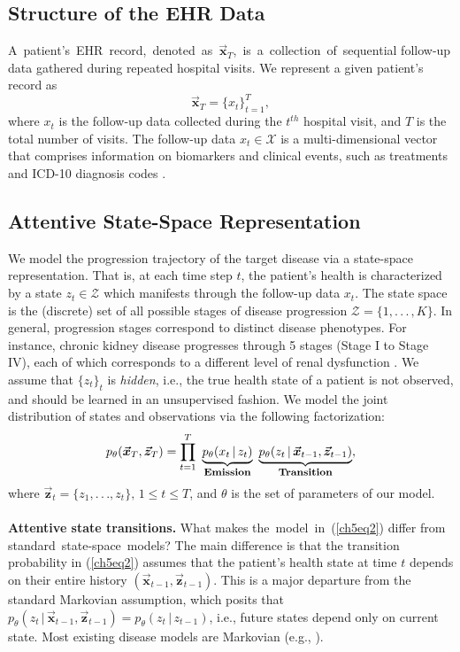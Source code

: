 \documentclass [PhD] {uclathes}
\begin{document}
\subsection{Structure of the EHR Data}
\label{ch5sec21}
A~patient's~EHR~record,~denoted~as~$\boldsymbol{\vec{x}}_T$,~is~a~collection~of~sequential follow-up data gathered during repeated hospital visits. We represent a given patient's record as  
\begin{equation}
\boldsymbol{\vec{x}}_T = \{x_{t}\}^{T}_{t=1}, 
\label{ch5eq1}
\end{equation}    
where $x_{t}$ is the follow-up data collected during the $t^{th}$ hospital visit, and $T$ is the total number of visits. The follow-up data $x_{t} \in \mathcal{X}$ is a multi-dimensional vector that comprises information on biomarkers and clinical events, such as treatments and ICD-10 diagnosis codes \cite{blumenthal2010meaningful}. 

\subsection{Attentive State-Space Representation}
\label{ch5sec22}
We model the progression trajectory of the target disease via a state-space representation. That is, at each time step $t$, the patient's health is characterized by a state $z_t \in \mathcal{Z}$ which manifests through the follow-up data $x_t$. The state space is the (discrete) set of all possible stages of disease progression $\mathcal{Z} = \{1,.\,.\,.\,,K\}$. In general, progression stages correspond to distinct disease  phenotypes. For instance, chronic kidney disease progresses through 5 stages (Stage I to Stage IV), each of which corresponds to a different level of renal dysfunction \cite{eddy2006chronic}. We assume that $\{z_t\}_{t}$ is {\it hidden}, i.e., the true health state of a patient is not observed, and should be learned in an unsupervised fashion. We model the joint distribution of states and observations via the following factorization: 
\begin{align}
p_{\theta}(\boldsymbol{\vec{x}}_T, \boldsymbol{\vec{z}}_T) = \prod^{T}_{t=1}\,\, \underbrace{p_{\theta}(x_{t}\,|\,z_{t})}_{\mbox{\footnotesize {\bf Emission}}}\,\,\underbrace{p_{\theta}(z_{t}\,|\,\boldsymbol{\vec{x}}_{t-1}, \boldsymbol{\vec{z}}_{t-1})}_{\mbox{\footnotesize {\bf Transition}}}, 
\label{ch5eq2}
\end{align}
where $\boldsymbol{\vec{z}}_t = \{z_1,.\,.\,.,z_t\},\, 1 \leq t \leq T$, and $\theta$ is the set of parameters of our model.\\ 
\\
{\bf Attentive state transitions.} What makes the~model~in~(\ref{ch5eq2}) differ from standard~state-space~models? The main difference is that the transition probability in (\ref{ch5eq2}) assumes that the patient's health state at time $t$ depends on their entire history $(\boldsymbol{\vec{x}}_{t-1}, \boldsymbol{\vec{z}}_{t-1})$. This is a major departure from the standard Markovian assumption, which posits that $p_{\theta}(z_{t}\,|\,\boldsymbol{\vec{x}}_{t-1}, \boldsymbol{\vec{z}}_{t-1}) = p_{\theta}(z_{t}\,|\,z_{t-1})$, i.e., future states depend only on current state. Most existing disease models are Markovian (e.g., \cite{liu2015efficient,wang2014unsupervised}).
\end{document}
